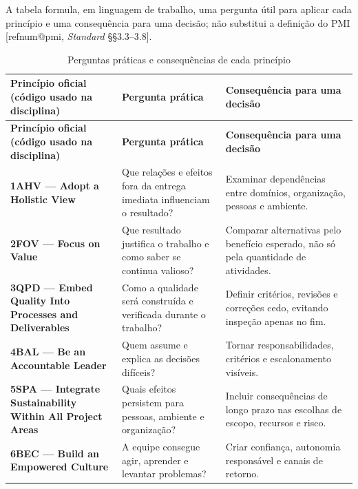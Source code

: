 \documentclass[12pt,a4paper,article,oneside,english,brazil]{abntex2}
\makeatletter
\newcommand{\fontetab}[1]{\par\vspace{3pt}{\small\noindent Fonte: #1\par}}
\newcommand{\refnum}[1]{\csname refnum@#1\endcsname}
\newcommand{\cit}[1]{[\refnum{#1}]}
\makeatother
\begin{document}
A tabela formula, em linguagem de trabalho, uma pergunta útil para aplicar cada princípio e uma consequência para uma decisão; não substitui a definição do PMI [\refnum{pmi}, \textit{Standard} §§3.3–3.8].

\begingroup\SingleSpacing\small
\begin{longtable}{@{}>{\raggedright\arraybackslash}p{}>{\raggedright\arraybackslash}p{}>{\raggedright\arraybackslash}p{}@{}}
\caption{Perguntas práticas e consequências de cada princípio}\label{tab:t3}\\
\hline
\textbf{Princípio oficial (código usado na disciplina)} & \textbf{Pergunta prática} & \textbf{Consequência para uma decisão}\\
\hline
\endfirsthead
\hline
\textbf{Princípio oficial (código usado na disciplina)} & \textbf{Pergunta prática} & \textbf{Consequência para uma decisão}\\
\hline
\endhead
\hline
\endfoot
\hline
\endlastfoot
\textbf{1AHV — Adopt a Holistic View} & Que relações e efeitos fora da entrega imediata influenciam o resultado? & Examinar dependências entre domínios, organização, pessoas e ambiente.\\[3pt]
\textbf{2FOV — Focus on Value} & Que resultado justifica o trabalho e como saber se continua valioso? & Comparar alternativas pelo benefício esperado, não só pela quantidade de atividades.\\[3pt]
\textbf{3QPD — Embed Quality Into Processes and Deliverables} & Como a qualidade será construída e verificada durante o trabalho? & Definir critérios, revisões e correções cedo, evitando inspeção apenas no fim.\\[3pt]
\textbf{4BAL — Be an Accountable Leader} & Quem assume e explica as decisões difíceis? & Tornar responsabilidades, critérios e escalonamento visíveis.\\[3pt]
\textbf{5SPA — Integrate Sustainability Within All Project Areas} & Quais efeitos persistem para pessoas, ambiente e organização? & Incluir consequências de longo prazo nas escolhas de escopo, recursos e risco.\\[3pt]
\textbf{6BEC — Build an Empowered Culture} & A equipe consegue agir, aprender e levantar problemas? & Criar confiança, autonomia responsável e canais de retorno.\\[3pt]
\end{longtable}
\endgroup
\fontetab{Elaborado pelos autores (2026), com base em \cit{pmi}.}
\end{document}
